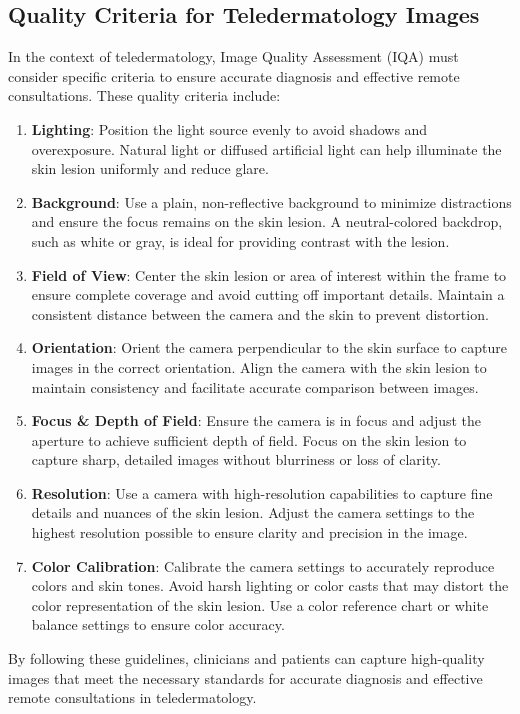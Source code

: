 \subsection{Quality Criteria for Teledermatology Images}
\label{sub:QualityCriteriaTeledermatology}
In the context of teledermatology, Image Quality Assessment (IQA) must consider specific criteria to ensure accurate diagnosis and effective remote consultations. These quality criteria include:

\begin{enumerate}
    \item \textbf{Lighting}: Position the light source evenly to avoid shadows and overexposure. Natural light or diffused artificial light can help illuminate the skin lesion uniformly and reduce glare.
    \item \textbf{Background}: Use a plain, non-reflective background to minimize distractions and ensure the focus remains on the skin lesion. A neutral-colored backdrop, such as white or gray, is ideal for providing contrast with the lesion.
    \item \textbf{Field of View}: Center the skin lesion or area of interest within the frame to ensure complete coverage and avoid cutting off important details. Maintain a consistent distance between the camera and the skin to prevent distortion.
    \item \textbf{Orientation}: Orient the camera perpendicular to the skin surface to capture images in the correct orientation. Align the camera with the skin lesion to maintain consistency and facilitate accurate comparison between images.
    \item \textbf{Focus \& Depth of Field}: Ensure the camera is in focus and adjust the aperture to achieve sufficient depth of field. Focus on the skin lesion to capture sharp, detailed images without blurriness or loss of clarity.
    \item \textbf{Resolution}: Use a camera with high-resolution capabilities to capture fine details and nuances of the skin lesion. Adjust the camera settings to the highest resolution possible to ensure clarity and precision in the image.
    \item \textbf{Color Calibration}: Calibrate the camera settings to accurately reproduce colors and skin tones. Avoid harsh lighting or color casts that may distort the color representation of the skin lesion. Use a color reference chart or white balance settings to ensure color accuracy.
\end{enumerate}
By following these guidelines, clinicians and patients can capture high-quality images that meet the necessary standards for accurate diagnosis and effective remote consultations in teledermatology.

